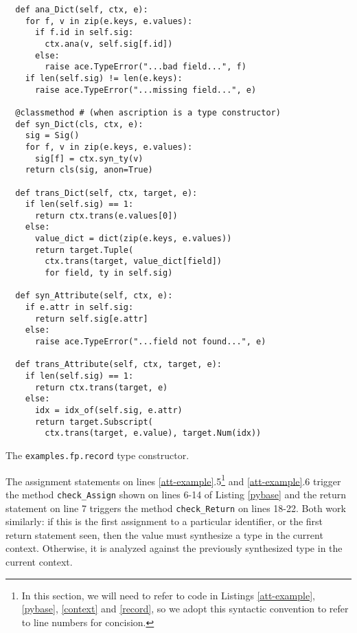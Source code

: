\documentclass[10pt,preprint]{sigplanconf}
\begin{document}
{\begin{codelisting}
\begin{lstlisting}
  def ana_Dict(self, ctx, e):
    for f, v in zip(e.keys, e.values):
      if f.id in self.sig:
        ctx.ana(v, self.sig[f.id])
      else:
        raise ace.TypeError("...bad field...", f)
    if len(self.sig) != len(e.keys):
      raise ace.TypeError("...missing field...", e)
      
  @classmethod # (when ascription is a type constructor)
  def syn_Dict(cls, ctx, e):
    sig = Sig()
    for f, v in zip(e.keys, e.values):
      sig[f] = ctx.syn_ty(v)
    return cls(sig, anon=True)

  def trans_Dict(self, ctx, target, e):
    if len(self.sig) == 1:
      return ctx.trans(e.values[0])
    else:
      value_dict = dict(zip(e.keys, e.values))
	  return target.Tuple(
	    ctx.trans(target, value_dict[field])
	    for field, ty in self.sig)

  def syn_Attribute(self, ctx, e): 
    if e.attr in self.sig: 
      return self.sig[e.attr]
    else:
      raise ace.TypeError("...field not found...", e)
      
  def trans_Attribute(self, ctx, target, e): 
    if len(self.sig) == 1:
      return ctx.trans(target, e)
    else:
      idx = idx_of(self.sig, e.attr)
      return target.Subscript(
        ctx.trans(target, e.value), target.Num(idx))
\end{lstlisting}
%
\caption{The \texttt{examples.fp.record} type constructor.}
\label{record}
\end{codelisting}
The assignment statements on lines \ref{att-example}.5\footnote{In this section, we will need to refer to code in Listings \ref{att-example}, \ref{pybase}, \ref{context} and \ref{record}, so we adopt this syntactic convention to refer to line numbers for concision.} and \ref{att-example}.6 trigger the method \verb|check_Assign| shown on lines 6-14 of Listing \ref{pybase} and the return statement on line 7 triggers the method \verb|check_Return| on lines 18-22. Both work similarly: if this is the first assignment to a particular identifier, or the first return statement seen, then the value must synthesize a type in the current context. Otherwise, it is analyzed against the previously synthesized type in the current context.


}
\end{document}
